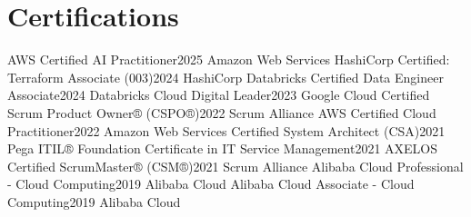 \section{Certifications}
  \resumeSubHeadingListStart
    \resumeSubheading
      {AWS Certified AI Practitioner}{2025}
      {Amazon Web Services}{}
    \resumeSubheading
      {HashiCorp Certified: Terraform Associate (003)}{2024}
      {HashiCorp}{}
    \resumeSubheading
      {Databricks Certified Data Engineer Associate}{2024}
      {Databricks}{}
    \resumeSubheading
      {Cloud Digital Leader}{2023}
      {Google Cloud}{}
    \resumeSubheading
      {Certified Scrum Product Owner® (CSPO®)}{2022}
      {Scrum Alliance}{}
    \resumeSubheading
      {AWS Certified Cloud Practitioner}{2022}
      {Amazon Web Services}{}
    \resumeSubheading
      {Certified System Architect (CSA)}{2021}
      {Pega}{}
    \resumeSubheading
      {ITIL® Foundation Certificate in IT Service Management}{2021}
      {AXELOS}{}
    \resumeSubheading
      {Certified ScrumMaster® (CSM®)}{2021}
      {Scrum Alliance}{}
    \resumeSubheading
      {Alibaba Cloud Professional - Cloud Computing}{2019}
      {Alibaba Cloud}{}
    \resumeSubheading
      {Alibaba Cloud Associate - Cloud Computing}{2019}
      {Alibaba Cloud}{}
  \resumeSubHeadingListEnd